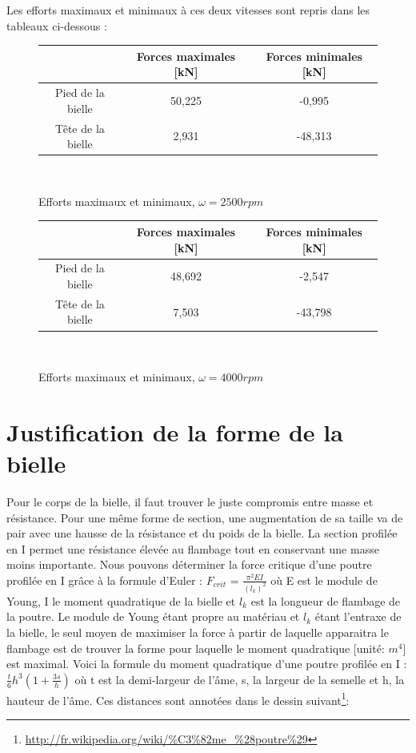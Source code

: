 \documentclass[a4paper,oneside,11pt]{report}
\begin{document}
Les efforts maximaux et minimaux à ces deux vitesses sont repris dans les tableaux ci-dessous : \\

\begin{figure}[h!]
\begin{center}
\begin{tabular}{|c||c|c|}
\hline 
\ & Forces maximales [kN] & Forces minimales [kN] \\ 
\hline 
Pied de la bielle & 50,225 & -0,995 \\ 
\hline 
Tête de la bielle & 2,931 & -48,313 \\ 
\hline 
\end{tabular} \\
\end{center}
\caption{Efforts maximaux et minimaux, $\omega=2500rpm$}
\end{figure}

\begin{figure}[h!]
\begin{center}
\begin{tabular}{|c||c|c|}
\hline 
\ & Forces maximales [kN] & Forces minimales [kN] \\ 
\hline 
Pied de la bielle & 48,692 & -2,547 \\ 
\hline 
Tête de la bielle &  7,503 & -43,798 \\ 
\hline 
\end{tabular} \\
\caption{Efforts maximaux et minimaux, $\omega=4000rpm$}
\end{center}
\end{figure}

\section{Justification de la forme de la bielle}

 Pour le corps de la bielle, il faut trouver le juste compromis entre masse et résistance. Pour une même forme de section, une augmentation de sa taille va de pair avec une hausse de la résistance et du poids de la bielle. La section profilée en I permet une résistance élevée au flambage tout en conservant une masse moins importante. Nous pouvons déterminer la force critique d'une poutre profilée en I grâce à la formule d'Euler : $F_{crit}$ = $\frac{\pi^2EI}{(l_k)^2}$ où E est le module de Young, I le moment quadratique de la bielle et $l_k$ est la longueur de flambage de la poutre. Le module de Young étant propre au matériau et $l_k$ étant l'entraxe de la bielle, le seul moyen de maximiser la force à partir de laquelle apparaitra le flambage est de trouver la forme pour laquelle le moment quadratique [unité: $m^4$] est maximal. Voici la formule du moment quadratique d'une poutre profilée en I : $\frac{t}{6}h^3(1+\frac{3s}{h})$ où t est la demi-largeur de l'âme, s, la largeur de la semelle et h, la hauteur de l'âme. Ces distances sont annotées dans le dessin suivant\footnote{\url{http://fr.wikipedia.org/wiki/\%C3\%82me_\%28poutre\%29}}:
 
\end{document}
